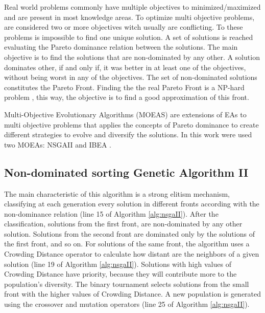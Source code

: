 Real world problems commonly have multiple objectives to minimized/maximized and are present in most knowledge areas. To optimize multi objective problems, are considered two or more objectives witch usually are conflicting. To these problems is impossible to find one unique solution. A set of solutions is reached evaluating the Pareto dominance relation \cite{pareto} between the solutions. The main objective is to find the solutions that are non-dominated by any other. A solution dominates other, if and only if, it was better in at least one of the objectives, without being worst in any of the objectives. The set of non-dominated solutions constitutes the Pareto Front. Finding the the real Pareto Front is a NP-hard problem \cite{fonseca2005tutorial}, this way, the objective is to find a good approximation of this front.


Multi-Objective Evolutionary Algorithms (MOEAS) are extensions of EAs to multi objective problems that applies the concepts of Pareto dominance to create different strategies to evolve and diversify the solutions. In this work were used two MOEAs: NSGAII \cite{deb2002fast} and IBEA \cite{zitzler2004indicator}.


\subsection{Non-dominated sorting Genetic Algorithm II}


The main characteristic of this algorithm is a strong elitism mechanism, classifying at each generation every solution in different fronts according with the non-dominance relation (line 15 of Algorithm \ref{alg:nsgaII}). After the classification, solutions from the first front, are non-dominated by any other solution. Solutions from the second front are dominated only by the solutions of the first front, and so on. For solutions of the same front, the algorithm uses a Crowding Distance operator to calculate how distant are the neighbors of a given solution (line 19 of Algorithm \ref{alg:nsgaII}). Solutions with high values of Crowding Distance have priority, because they will contribute more to the population's diversity. The binary tournament selects solutions from the small front with the higher values of Crowding Distance. A new population is generated using the crossover and mutation operators (line 25 of Algorithm \ref{alg:nsgaII}).


